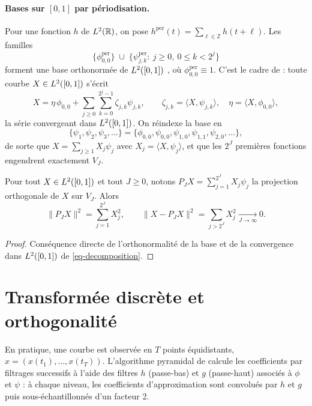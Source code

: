 \paragraph{Bases sur $[0,1]$ par périodisation.} Pour une fonction $h$ de $L^2(\mathbb{R})$, on pose $h^{\mathrm{per}}(t)=\sum_{\ell\in\mathbb{Z}}h(t+\ell)$. Les familles
\[
  \bigl\{\phi_{0,0}^{\mathrm{per}}\bigr\}\;\cup\;\bigl\{\psi_{j,k}^{\mathrm{per}}:\ j\ge0,\ 0\le k<2^j\bigr\}
\]
forment une base orthonormée de $L^2([0,1])$ \citep[section 9.3]{daubechies1992ten}, où $\phi^{\mathrm{per}}_{0,0}\equiv1$. C'est le cadre de \citet{berlinet2008functional} : toute courbe $X\in L^2([0,1])$ s'écrit
\begin{equation}\label{eq-decomposition}
  X = \eta\,\phi_{0,0} + \sum_{j\ge0}\sum_{k=0}^{2^j-1}\zeta_{j,k}\psi_{j,k},
  \qquad \zeta_{j,k}=\langle X,\psi_{j,k}\rangle,\quad \eta=\langle X,\phi_{0,0}\rangle,
\end{equation}
la série convergeant dans $L^2([0,1])$. On réindexe la base en
\[
  \{\psi_1,\psi_2,\psi_3,\dots\}=\{\phi_{0,0},\psi_{0,0},\psi_{1,0},\psi_{1,1},\psi_{2,0},\dots\},
\]
de sorte que $X=\sum_{j\ge1}X_j\psi_j$ avec $X_j=\langle X,\psi_j\rangle$, et que les $2^J$ premières fonctions engendrent exactement $V_J$.

\begin{proposition}\label{prop-parseval}
Pour tout $X\in L^2([0,1])$ et tout $J\ge0$, notons $P_J X=\sum_{j=1}^{2^J}X_j\psi_j$ la projection orthogonale de $X$ sur $V_J$. Alors
\[
  \|P_JX\|^2=\sum_{j=1}^{2^J}X_j^2,\qquad \|X-P_JX\|^2=\sum_{j>2^J}X_j^2\xrightarrow[J\to\infty]{}0.
\]
\end{proposition}

\begin{proof}
Conséquence directe de l'orthonormalité de la base et de la convergence dans $L^2([0,1])$ de \eqref{eq-decomposition}.
\end{proof}

\section{Transformée discrète et orthogonalité}\label{sec-dwt}

En pratique, une courbe est observée en $T$ points équidistants, $x=(x(t_1),\dots,x(t_T))$. L'algorithme pyramidal de \citet{mallat1989theory} calcule les coefficients par filtrages successifs à l'aide des filtres $h$ (passe-bas) et $g$ (passe-haut) associés à $\phi$ et $\psi$ : à chaque niveau, les coefficients d'approximation sont convolués par $h$ et $g$ puis sous-échantillonnés d'un facteur 2.

